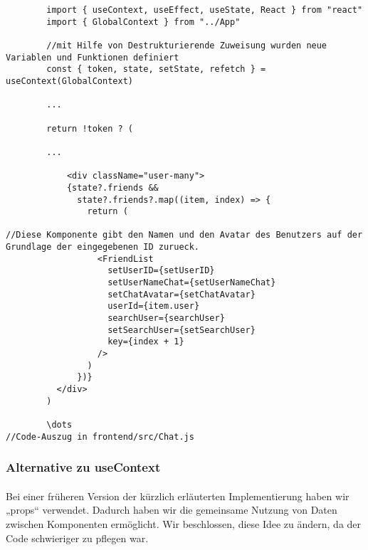     \begin{lstlisting}
        import { useContext, useEffect, useState, React } from "react"
        import { GlobalContext } from "../App"
        
        //mit Hilfe von Destrukturierende Zuweisung wurden neue Variablen und Funktionen definiert
        const { token, state, setState, refetch } = useContext(GlobalContext)

        ...

        return !token ? (

        ...

            <div className="user-many">
            {state?.friends &&
              state?.friends?.map((item, index) => {
                return (

//Diese Komponente gibt den Namen und den Avatar des Benutzers auf der Grundlage der eingegebenen ID zurueck.
                  <FriendList
                    setUserID={setUserID}
                    setUserNameChat={setUserNameChat}
                    setChatAvatar={setChatAvatar}
                    userId={item.user}
                    searchUser={searchUser}
                    setSearchUser={setSearchUser}
                    key={index + 1}
                  />
                )
              })}
          </div>
        )

        \dots
//Code-Auszug in frontend/src/Chat.js

    \end{lstlisting}

\subsubsection{Alternative zu useContext}
\paragraph{}
Bei einer früheren Version der kürzlich erläuterten Implementierung haben wir  „props“ verwendet. Dadurch haben wir die gemeinsame Nutzung von Daten zwischen Komponenten ermöglicht. Wir beschlossen, diese Idee zu ändern, da der Code schwieriger zu pflegen war.
\\


